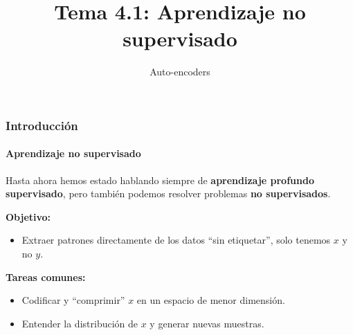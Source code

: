 \documentclass[aspectratio=169]{beamer}
\title{Tema 4.1: Aprendizaje no supervisado}
\subtitle{Auto-encoders}
\begin{document}
\begin{frame}[plain]
	\titlepage 
\end{frame}

\logo{}


\begin{frame}[t]
  \frametitle{Introducción}
  \framesubtitle{Aprendizaje no supervisado}
  \begin{block}{}
    Hasta ahora hemos estado hablando siempre de \textbf{aprendizaje profundo supervisado}, pero también podemos resolver problemas \textbf{no supervisados}.
  \end{block}
  \vspace{.3cm}
  \textbf{Objetivo:}
  \begin{itemize}
    \item Extraer patrones directamente de los datos ``sin etiquetar'', solo tenemos $x$ y no $y$.
  \end{itemize}
  \vspace{.3cm}
  \textbf{Tareas comunes:}
  \begin{itemize}
    \item Codificar y ``comprimir'' $x$ en un espacio de menor dimensión.
    \item Entender la distribución de $x$ y generar nuevas muestras.
  \end{itemize}
\end{frame}


\end{document}
